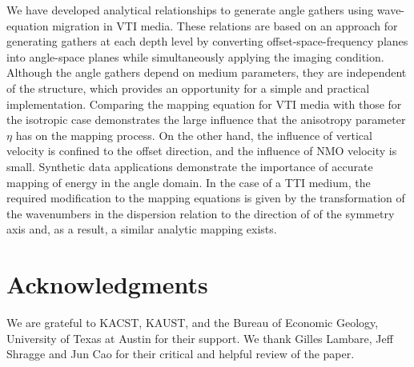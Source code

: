 We have developed analytical relationships to generate angle gathers
using wave-equation migration in VTI media. These relations are based
on an approach for generating gathers at each depth level by
converting offset-space-frequency planes into angle-space planes while
simultaneously applying the imaging condition. Although the angle
gathers depend on medium parameters, they are
independent of the structure, which provides an opportunity for a
simple and practical implementation.  Comparing the mapping equation
for VTI media with those for the isotropic case demonstrates the large
influence that the anisotropy parameter $\eta$ has on the mapping
process. On the other hand, the influence of vertical velocity is
confined to the offset direction, and the influence of NMO velocity is
small.
Synthetic data applications demonstrate the importance of accurate mapping of energy
in the angle domain. In the case of a TTI medium, the required modification to the mapping equations
is given by the transformation of the wavenumbers in the dispersion relation 
to the direction of of the symmetry axis and, as a result, a similar analytic mapping
exists.

\section{Acknowledgments}

We are grateful to KACST, KAUST, and the Bureau of Economic Geology, University of Texas at
  Austin for their support. We thank Gilles Lambare, Jeff Shragge and Jun Cao for their critical and helpful review of the paper.

